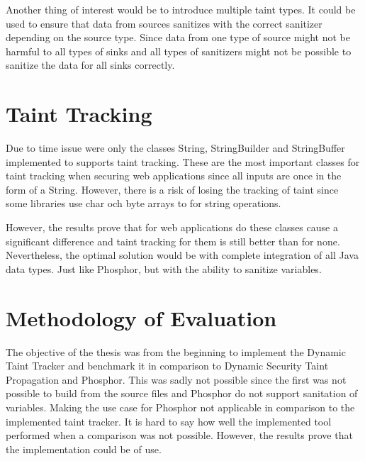 Another thing of interest would be to introduce multiple taint types. It could be used to ensure that data from sources sanitizes with the correct sanitizer depending on the source type. Since data from one type of source might not be harmful to all types of sinks and all types of sanitizers might not be possible to sanitize the data for all sinks correctly.



\section{Taint Tracking}
\label{propagation}
Due to time issue were only the classes String, StringBuilder and StringBuffer implemented to supports taint tracking. These are the most important classes for taint tracking when securing web applications since all inputs are once in the form of a String. However, there is a risk of losing the tracking of taint since some libraries use char och byte arrays to for string operations.

However, the results prove that for web applications do these classes cause a significant difference and taint tracking for them is still better than for none. Nevertheless, the optimal solution would be with complete integration of all Java data types. Just like Phosphor, but with the ability to sanitize variables.



\section{Methodology of Evaluation}
\label{methev}
The objective of the thesis was from the beginning to implement the Dynamic Taint Tracker and benchmark it in comparison to Dynamic Security Taint Propagation and Phosphor. This was sadly not possible since the first was not possible to build from the source files and Phosphor do not support sanitation of variables. Making the use case for Phosphor not applicable in comparison to the implemented taint tracker. It is hard to say how well the implemented tool performed when a comparison was not possible. However, the results prove that the implementation could be of use.